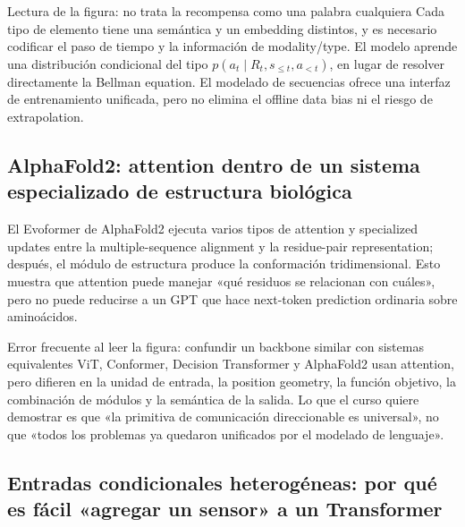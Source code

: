 \begin{knowledgebox}{Lectura de la figura: no trata la recompensa como una palabra cualquiera}
Cada tipo de elemento tiene una semántica y un embedding distintos, y es necesario codificar el paso de tiempo y la información de modality/type. El modelo aprende una distribución condicional del tipo $p(a_t\mid R_t,s_{\le t},a_{<t})$, en lugar de resolver directamente la Bellman equation. El modelado de secuencias ofrece una interfaz de entrenamiento unificada, pero no elimina el offline data bias ni el riesgo de extrapolation.
\end{knowledgebox}

\subsection{AlphaFold2: attention dentro de un sistema especializado de estructura biológica}

El Evoformer de AlphaFold2 ejecuta varios tipos de attention y specialized updates entre la multiple-sequence alignment y la residue-pair representation; después, el módulo de estructura produce la conformación tridimensional. Esto muestra que attention puede manejar «qué residuos se relacionan con cuáles», pero no puede reducirse a un GPT que hace next-token prediction ordinaria sobre aminoácidos.


\begin{warningbox}{Error frecuente al leer la figura: confundir un backbone similar con sistemas equivalentes}
ViT, Conformer, Decision Transformer y AlphaFold2 usan attention, pero difieren en la unidad de entrada, la position geometry, la función objetivo, la combinación de módulos y la semántica de la salida. Lo que el curso quiere demostrar es que «la primitiva de comunicación direccionable es universal», no que «todos los problemas ya quedaron unificados por el modelado de lenguaje».
\end{warningbox}

\subsection{Entradas condicionales heterogéneas: por qué es fácil «agregar un sensor» a un Transformer}

